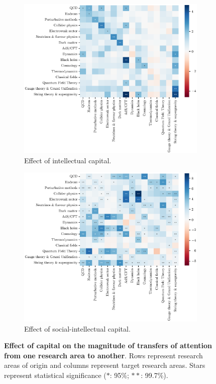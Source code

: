 \documentclass{article}
\begin{document}
\begin{figure}[h]
\hspace{-2em}
\begin{subfigure}{.5\textwidth}
    \includegraphics[width=1\textwidth]{plots/ei_gamma_control_nu.eps}
    \caption{Effect of intellectual capital.}
    \label{fig:intellectual-capital-effect}
\end{subfigure}%
\begin{subfigure}{.5\textwidth}
    \includegraphics[width=1\textwidth]{plots/ei_delta_control_nu.eps}
    \caption{Effect of social-intellectual capital.}
    \label{fig:social-capital-effect}
\end{subfigure}
\caption{\textbf{Effect of capital on the magnitude of transfers of attention from one research area to another}. Rows represent research areas of origin and columns represent target research areas. Stars represent statistical significance ($\ast$: 95\%; $\ast\ast$: 99.7\%).}
\label{fig:test}
\end{figure}
\end{document}
